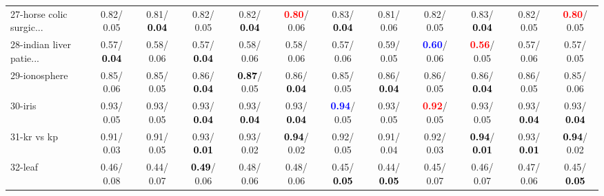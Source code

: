 \begin{table}[h]
\begin{center}
{\begin{tabular}{lc|c|c|c|c|c|c|c|c|c|c}
27-horse colic surgic... &   0.82/  0.05 &   0.81/\textcolor{black}{\textbf{  0.04}} &   0.82/  0.05 &   0.82/\textcolor{black}{\textbf{  0.04}} & \textcolor{red}{\textbf{  0.80}}/  0.06 &   0.83/\textcolor{black}{\textbf{  0.04}} &   0.81/  0.06 &   0.82/  0.05 &   0.83/\textcolor{black}{\textbf{  0.04}} &   0.82/  0.05 & \textcolor{red}{\textbf{  0.80}}/  0.05 \\
28-indian liver patie... &   0.57/\textcolor{black}{\textbf{  0.04}} &   0.58/  0.06 &   0.57/\textcolor{black}{\textbf{  0.04}} &   0.58/  0.06 &   0.58/  0.06 &   0.57/  0.06 &   0.59/  0.05 & \textcolor{blue}{\textbf{  0.60}}/  0.06 & \textcolor{red}{\textbf{  0.56}}/  0.05 &   0.57/  0.06 &   0.57/  0.05 \\ \hline
29-ionosphere &   0.85/  0.06 &   0.85/  0.05 &   0.86/\textcolor{black}{\textbf{  0.04}} & \textcolor{black}{\textbf{  0.87}}/  0.05 &   0.86/\textcolor{black}{\textbf{  0.04}} &   0.85/  0.05 &   0.86/\textcolor{black}{\textbf{  0.04}} &   0.86/  0.05 &   0.86/\textcolor{black}{\textbf{  0.04}} &   0.86/  0.05 &   0.85/  0.06 \\
30-iris &   0.93/  0.05 &   0.93/  0.05 &   0.93/\textcolor{black}{\textbf{  0.04}} &   0.93/\textcolor{black}{\textbf{  0.04}} &   0.93/\textcolor{black}{\textbf{  0.04}} & \textcolor{blue}{\textbf{  0.94}}/  0.05 &   0.93/  0.05 & \textcolor{red}{\textbf{  0.92}}/  0.05 &   0.93/  0.05 &   0.93/\textcolor{black}{\textbf{  0.04}} &   0.93/\textcolor{black}{\textbf{  0.04}} \\
31-kr vs kp &   0.91/  0.03 &   0.91/  0.05 &   0.93/\textcolor{black}{\textbf{  0.01}} &   0.93/  0.02 & \textcolor{black}{\textbf{  0.94}}/  0.02 &   0.92/  0.05 &   0.91/  0.04 &   0.92/  0.03 & \textcolor{black}{\textbf{  0.94}}/\textcolor{black}{\textbf{  0.01}} &   0.93/\textcolor{black}{\textbf{  0.01}} & \textcolor{black}{\textbf{  0.94}}/  0.02 \\
32-leaf &   0.46/  0.08 &   0.44/  0.07 & \textcolor{black}{\textbf{  0.49}}/  0.06 &   0.48/  0.06 &   0.48/  0.06 &   0.45/\textcolor{black}{\textbf{  0.05}} &   0.44/\textcolor{black}{\textbf{  0.05}} &   0.45/  0.07 &   0.46/  0.07 &   0.47/  0.06 &   0.45/\textcolor{black}{\textbf{  0.05}} \\\end{tabular}}\label{stratsBalAcc0bC4.5}
\end{center}
\end{table}
